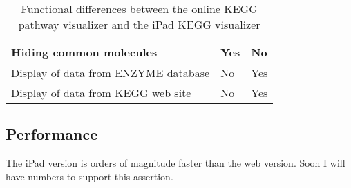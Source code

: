 \begin{table}[ht!]
\begin{tabular}{ | p{3in} | p{1in} | p{1in} | }
    Hiding common molecules
                        & Yes       & No \\ \hline

    Display of data from ENZYME database
                        & No        & Yes \\ \hline

    Display of data from KEGG web site
                        & No        & Yes \\ \hline
\end{tabular}
    \label{fig:kegg_comparison_table}
    \caption{Functional differences between the online KEGG pathway visualizer
    and the iPad KEGG visualizer}
\end{table}

\subsection{Performance}
\label{sect:kegg_comparison_performance}

The iPad version is orders of magnitude faster than the web version. Soon I will
have numbers to support this assertion.
